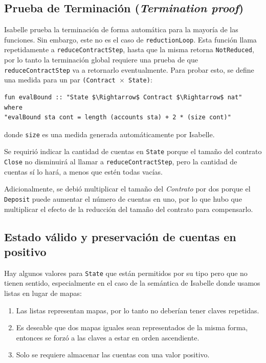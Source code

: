 \documentclass[12pt]{book}
\begin{document}
\subsection{Prueba de Terminación (\textit{Termination proof})}
Isabelle prueba la terminación de forma automática para la mayoría de las funciones. Sin embargo, este no es el caso de \texttt{reductionLoop}. Esta función llama repetidamente a \texttt{reduceContractStep}, hasta que la misma retorna \texttt{NotReduced}, por lo tanto la terminación global requiere una prueba de que \texttt{reduceContractStep} va a retornarlo eventualmente. Para probar esto, se define una medida para un par \texttt{(Contract $\times$ State)}:

\begin{lstlisting}[style=Isabelle, caption=Función que será utilizada por \textit{measure} para probar la terminación de \textit{reductionLoop}., label={lst:evalBound}]
fun evalBound :: "State $\Rightarrow$ Contract $\Rightarrow$ nat" where
"evalBound sta cont = length (accounts sta) + 2 * (size cont)"
\end{lstlisting}
donde \texttt{size} es una medida generada automáticamente por Isabelle. 

Se requirió indicar la cantidad de cuentas en \texttt{State} porque el tamaño del contrato \texttt{Close} no disminuirá al llamar a \texttt{reduceContractStep}, pero la cantidad de cuentas sí lo hará, a menos que estén todas vacías.

Adicionalmente, se debió multiplicar el tamaño del \textit{Contrato} por dos porque el \texttt{Deposit} puede aumentar el número de cuentas en uno, por lo que hubo que multiplicar el efecto de la reducción del tamaño del contrato para compensarlo.

\subsection{Estado válido y preservación de cuentas en positivo}
Hay algunos valores para \texttt{State} que están permitidos por su tipo pero que no tienen sentido, especialmente en el caso de la semántica de Isabelle donde usamos listas en lugar de mapas:

\begin{enumerate}
    \item Las listas representan mapas, por lo tanto no deberían tener claves repetidas.
    \item Es deseable que dos mapas iguales sean representados de la misma forma, entonces se forzó a las claves a estar en orden ascendiente.
    \item Solo se requiere almacenar las cuentas con una valor positivo.
\end{enumerate}
\end{document}
